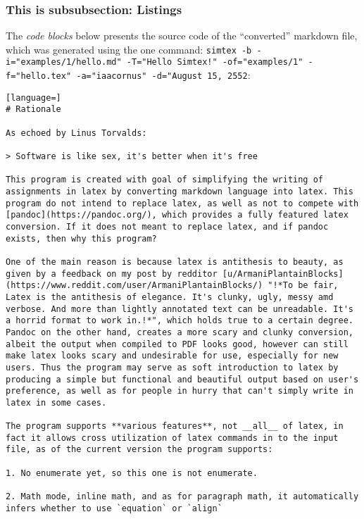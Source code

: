 \documentclass[12pt, UTF8]{article}
\begin{document}
	\subsubsection{This is subsubsection: Listings}
	
	The \emph{code blocks} below presents the source code of the ``converted'' markdown file, which was generated using the one command: \texttt{simtex -b -i="examples/1/hello.md" -T="Hello Simtex!" -of="examples/1" -f="hello.tex" -a="iaacornus" -d="August 15, 2552}:
	
\begin{lstlisting}[language=]
# Rationale

As echoed by Linus Torvalds:

> Software is like sex, it's better when it's free

This program is created with goal of simplifying the writing of assignments in latex by converting markdown language into latex. This program do not intend to replace latex, as well as not to compete with [pandoc](https://pandoc.org/), which provides a fully featured latex conversion. If it does not meant to replace latex, and if pandoc exists, then why this program?

One of the main reason is because latex is antithesis to beauty, as given by a feedback on my post by redditor [u/ArmaniPlantainBlocks](https://www.reddit.com/user/ArmaniPlantainBlocks/) "!*To be fair, Latex is the antithesis of elegance. It's clunky, ugly, messy amd verbose. And more than lightly annotated text can be unreadable. It's a horrid format to work in.!*", which holds true to a certain degree. Pandoc on the other hand, creates a more scary and clunky conversion, albeit the output when compiled to PDF looks good, however can still make latex looks scary and undesirable for use, especially for new users. Thus the program may serve as soft introduction to latex by producing a simple but functional and beautiful output based on user's preference, as well as for people in hurry that can't simply write in latex in some cases.

The program supports **various features**, not __all__ of latex, in fact it allows cross utilization of latex commands in to the input file, as of the current version the program supports:

1. No enumerate yet, so this one is not enumerate.

2. Math mode, inline math, and as for paragraph math, it automatically infers whether to use `equation` or `align`


\end{lstlisting}
\end{document}
